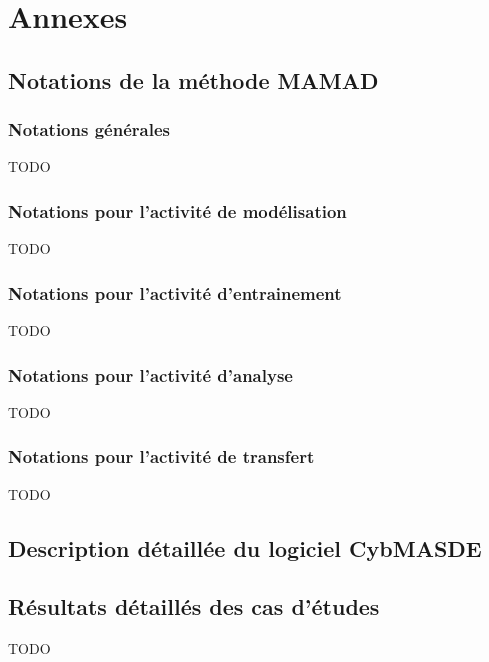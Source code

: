 \clearpage
\thispagestyle{empty}
\null
\newpage

\cleardoublepage
{}
{}
\part*{Annexes}
\label{part:annexes}

\clearpage
\thispagestyle{empty}
\null
\newpage

\chapter{Notations de la méthode MAMAD}

\section{Notations générales}
TODO

\section{Notations pour l'activité de modélisation}
TODO

\section{Notations pour l'activité d'entrainement}
TODO

\section{Notations pour l'activité d'analyse}
TODO

\section{Notations pour l'activité de transfert}
TODO

\clearpage
\thispagestyle{empty}
\null
\newpage

\chapter{Description détaillée du logiciel CybMASDE}

\clearpage
\thispagestyle{empty}
\null
\newpage

\chapter{Résultats détaillés des cas d'études}

TODO
